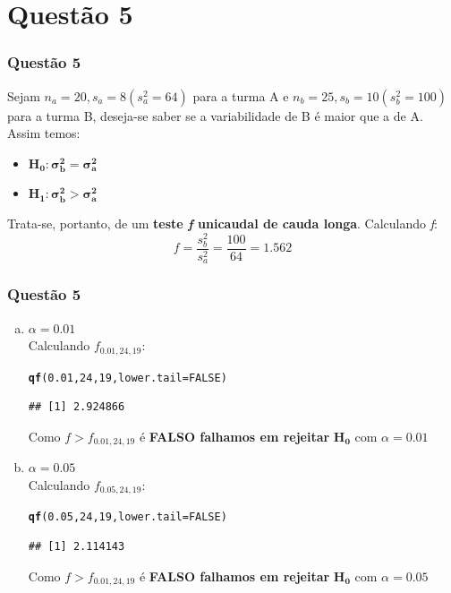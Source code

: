 \documentclass{beamer}\usepackage[]{graphicx}\usepackage[]{color}
\makeatletter
\newcommand{\hlnum}[1]{\textcolor[rgb]{0.686,0.059,0.569}{#1}}%
\newcommand{\hlstd}[1]{\textcolor[rgb]{0.345,0.345,0.345}{#1}}%
\newcommand{\hlkwc}[1]{\textcolor[rgb]{0.333,0.667,0.333}{#1}}%
\newcommand{\hlkwd}[1]{\textcolor[rgb]{0.737,0.353,0.396}{\textbf{#1}}}%
\newenvironment{kframe}{%
 \def\at@end@of@kframe{}%
 \ifinner\ifhmode%
  \def\at@end@of@kframe{\end{minipage}}%
  \begin{minipage}{\columnwidth}%
 \fi\fi%
 \def\FrameCommand##1{\hskip\@totalleftmargin \hskip-\fboxsep
 \colorbox{shadecolor}{##1}\hskip-\fboxsep
     \hskip-\linewidth \hskip-\@totalleftmargin \hskip\columnwidth}%
 \MakeFramed {\advance\hsize-\width
   \@totalleftmargin\z@ \linewidth\hsize
   \@setminipage}}%
 {\par\unskip\endMakeFramed%
 \at@end@of@kframe}
\newenvironment{knitrout}{}{} %
\makeatother
\begin{document}
	\section{Questão 5}
	        \begin{frame}
			\frametitle{Questão 5}
			Sejam $n_{a} = 20, s_{a} = 8(s_{a}^{2} = 64)$ para a turma A e $n_{b} = 25, s_{b} = 10(s_{b}^{2} = 100)$ para a turma B,
			deseja-se saber se a variabilidade de B é maior que a de A.  Assim temos:
			\begin{itemize}
				\item $\boldsymbol{H_{0}:  \sigma_{b}^{2} = \sigma_{a}^{2}}$
				\item $\boldsymbol{H_{1}:  \sigma_{b}^{2} > \sigma_{a}^{2}}$
			\end{itemize}
			Trata-se, portanto, de um \textbf{teste \textit{f} unicaudal de cauda longa}.  Calculando \textit{f}:
			$$f = \frac{s_{b}^{2}}{s_{a}^{2}} = \frac{100}{64} = 1.562$$
		\end{frame}
	
		\begin{frame}[fragile]
			\frametitle{Questão 5}
			\begin{enumerate}[a)]
				\item $\alpha = 0.01$\\
				Calculando $f_{0.01,24,19}$:
\begin{knitrout}
\color{fgcolor}\begin{kframe}
\begin{alltt}
\hlkwd{qf}\hlstd{(}\hlnum{0.01}\hlstd{,}\hlnum{24}\hlstd{,}\hlnum{19}\hlstd{,}\hlkwc{lower.tail} \hlstd{=} \hlnum{FALSE}\hlstd{)}
\end{alltt}
\begin{verbatim}
## [1] 2.924866
\end{verbatim}
\end{kframe}
\end{knitrout}
                        Como $f > f_{0.01,24,19}$ é \textbf{FALSO falhamos em rejeitar }$\boldsymbol{H_{0}}$ com $\alpha = 0.01$
                                    \item $\alpha = 0.05$\\
                                    Calculando $f_{0.05,24,19}$:
\begin{knitrout}
\color{fgcolor}\begin{kframe}
\begin{alltt}
\hlkwd{qf}\hlstd{(}\hlnum{0.05}\hlstd{,}\hlnum{24}\hlstd{,}\hlnum{19}\hlstd{,}\hlkwc{lower.tail} \hlstd{=} \hlnum{FALSE}\hlstd{)}
\end{alltt}
\begin{verbatim}
## [1] 2.114143
\end{verbatim}
\end{kframe}
\end{knitrout}
			Como $f > f_{0.01,24,19}$ é \textbf{FALSO falhamos em rejeitar }$\boldsymbol{H_{0}}$ com $\alpha = 0.05$
			\end{enumerate}
		\end{frame}
\end{document}
